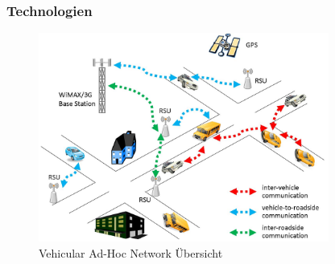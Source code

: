 \begin{frame}
    \frametitle{Technologien}

    \begin{figure}[H]
        \centering
        \includegraphics[width=0.85\textwidth]{resources/images/VANET.jpg}
        \caption{Vehicular Ad-Hoc Network Übersicht \cite{vanet1_img}}
    \end{figure}
\end{frame}

